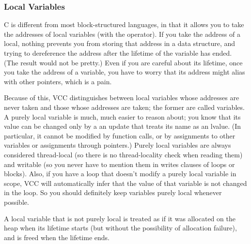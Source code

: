 %
%

\subsubsection{Local Variables}
C is different from most block-structured languages, in that it allows
you to take the addresses of local variables (with the \vcc{&}
operator). If you take the address of a local, nothing prevents you
from storing that address in a data structure, and trying to
dereference the address after the lifetime of the variable has
ended. (The result would not be pretty.) Even if you are careful about
its lifetime, once you take the address of a variable, you have to
worry that its address might alias with other pointers, which is a pain.

Because of this, VCC distinguishes between local variables whose
addresses are never taken and those whose addresses are taken; the
former are called  variables. A purely local
variable is much, much easier to reason about; you know that its value
can be changed only by a an update that treats its name as an
lvalue. (In particular, it cannot be modified by function calls, or by
assignments to other variables or assignments through pointers.)
Purely local variables are always considered thread-local (so there is
no thread-locality check when reading them) and writable (so you never
have to mention them in writes clauses of loops or blocks). Also, if
you have a loop that doesn't modify a purely local variable in scope,
VCC will automatically infer that the value of that variable is not
changed in the loop. So you should definitely keep variables purely
local whenever possible.

A local variable that is not purely local is treated as if it was
allocated on the heap when its lifetime starts (but without the
possibility of allocation failure), and is freed when the lifetime
ends. 

